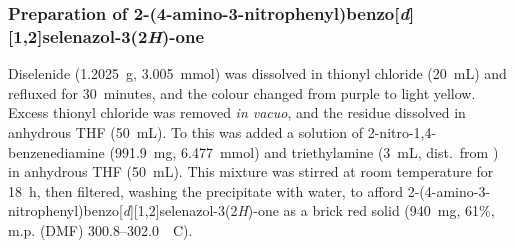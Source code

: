 \begin{refsection}

\subsubsection[Preparation of \refcmpd{ebs-nitroaniline}]{Preparation of 2-(4-amino-3-nitrophenyl)benzo[\emph{d}][1,2]selenazol-3(2\emph{H})-one }
Diselenide  (1.2025~g, 3.005~mmol) was dissolved in thionyl chloride (20~mL) and refluxed for 30~minutes, and the colour changed from purple to light yellow.
Excess thionyl chloride was removed \emph{in vacuo}, and the residue dissolved in anhydrous THF (50~mL).
To this was added a solution of 2-nitro-1,4-benzenediamine (991.9~mg, 6.477~mmol) and triethylamine (3~mL, dist.\ from ) in anhydrous THF (50~mL).
This mixture was stirred at room temperature for 18~h, then filtered, washing the precipitate with water, to afford 2-(4-amino-3-nitrophenyl)benzo[\emph{d}][1,2]selenazol-3(2\emph{H})-one  as a brick red solid (940~mg, 61\%, m.p. (DMF) 300.8--302.0~\degree~C).



\end{refsection}
